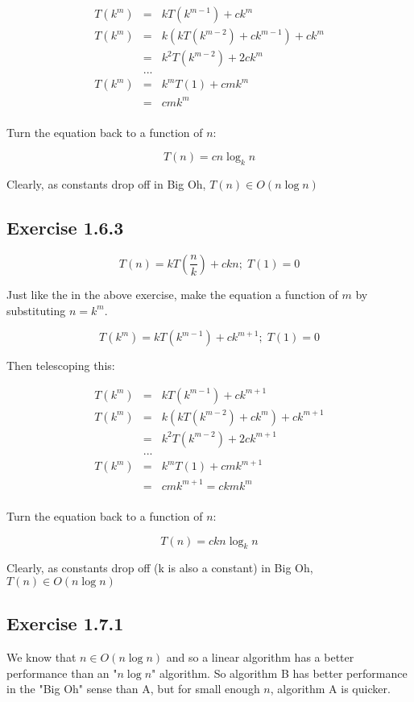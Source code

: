 \documentclass{article}
\begin{document}
\begin{eqnarray*}
T(k^m) &=& kT(k^{m-1}) + ck^m \\
T(k^m) &=& k(kT(k^{m-2})+ ck^{m-1}) + ck^m \\
&=&k^2T(k^{m-2}) + 2ck^m \\
&...& \\
T(k^m) &=& k^mT(1) + cmk^m \\
&=& cmk^m \\
\end{eqnarray*}

Turn the equation back to a function of \(n\):

\[T(n) = cn\log_k{n}\]

Clearly, as constants drop off in Big Oh, \(T(n) \in O(n\log{n})\)


\subsection*{Exercise 1.6.3}

\[ T(n) =kT(\frac{n}{k})+ckn;\; T(1)=0\]

Just like the in the above exercise, make the equation a function of \(m\) by substituting \(n=k^m\).

\[ T(k^m) = kT(k^{m-1})+ck^{m+1};\; T(1)=0\]

Then telescoping this:


\begin{eqnarray*}
T(k^m) &=& kT(k^{m-1}) + ck^{m+1} \\
T(k^m) &=& k(kT(k^{m-2})+ ck^m) + ck^{m+1} \\
&=&k^2T(k^{m-2}) + 2ck^{m+1} \\
&...& \\
T(k^m) &=& k^mT(1) + cmk^{m+1} \\
&=& cmk^{m+1} = ckmk^m\\
\end{eqnarray*}

Turn the equation back to a function of \(n\):

\[T(n) = ckn\log_k{n}\]

Clearly, as constants drop off (k is also a constant) in Big Oh, \(T(n) \in O(n\log{n})\)


\subsection*{Exercise 1.7.1}

We know that \(n \in O(n\log{n})\) and so a linear algorithm has a better performance than an "\(n\log{n}\)" algorithm. So algorithm B has better performance in the "Big Oh" sense than A, but for small enough \(n\), algorithm A is quicker. 
\end{document}
